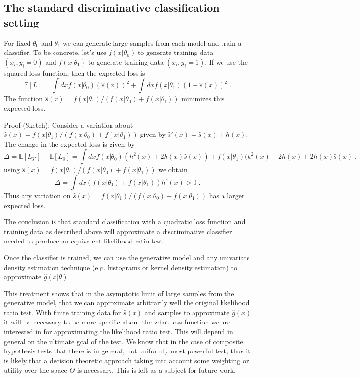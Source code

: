 \documentclass[11pt, oneside]{article}   	%
\begin{document}
\subsection{The standard discriminative classification setting} For fixed $\theta_0$ and $\theta_1$ we can generate 
large samples from each model and train a classifier. To be concrete, let's use $f(x|\theta_0)$ to generate training 
data $(x_i,  y_i=0)$ and $f(x|\theta_1)$ to generate training data $(x_i , y_i=1)$. 
If we use the squared-loss function, then the expected loss is
\begin{equation}
\mathbb{E}[L] = \int dx f(x|\theta_0)  (  \hat{s}(x) )^2  + \int dx f(x|\theta_1)  ( 1 - \hat{s}(x) )^2 \; .
\end{equation}
The function $\hat{s}(x) = f(x|\theta_1)/(f(x|\theta_0)+f(x|\theta_1))$ minimizes this expected loss.

Proof (Sketch): Consider a variation about $\hat{s}(x) = f(x|\theta_1)/(f(x|\theta_0)+f(x|\theta_1))$ given by $\hat{s}'(x) = \hat{s}(x) +h(x)$. The change in the expected loss is given by 
\begin{equation}
\Delta = \mathbb{E}[L_{\hat{s}'}]-\mathbb{E}[L_{\hat{s}}] = \int dx f(x|\theta_0)  (h^2(x) + 2 h(x)  \hat{s}(x) )  + f(x|\theta_1)   (h^2(x) - 2 h(x) + 2 h(x) \hat{s}(x)  \; .
\end{equation}
using $\hat{s}(x) = f(x|\theta_1)/(f(x|\theta_0)+f(x|\theta_1))$ we obtain
\begin{equation}
\Delta =  \int dx (f(x|\theta_0)+f(x|\theta_1))  h^2(x) >0    \; .
\end{equation}
Thus any variation on $\hat{s}(x) = f(x|\theta_1)/(f(x|\theta_0)+f(x|\theta_1))$ has a larger expected loss.

The conclusion is that standard classification with a quadratic loss function and training data as described above will approximate a discriminative classifier needed to produce an equivalent likelihood ratio test.

Once the classifier is trained, we can use the generative model and any univariate density estimation technique (e.g. histograms or kernel density estimation) to approximate $\hat{g}(x|\theta)$.

This treatment shows that in the asymptotic limit of large samples from the generative model, that we can approximate arbitrarily well the original likelihood ratio test. With finite training data for $\hat{s}(x)$ and samples to approximate $\hat{g}(x)$ it will be necessary to be more specific about the what loss function we are interested in for approximating the likelihood ratio test. This will depend in general on the ultimate goal of the test. We know that in the case of composite hypothesis tests that there is in general, not uniformly most powerful test, thus it is likely that a decision theoretic approach taking into account some weighting or utility over the space $\Theta$ is necessary. This is left as a subject for future work.
\end{document}
